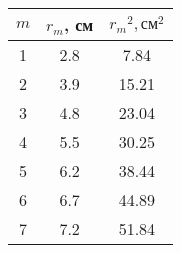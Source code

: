 \begin{tabular}{ccc}
\toprule
$m$ & $r_m$, см & ${r_m}^2, \text{см}^2$ \\
\midrule
1 & 2.8 & 7.84 \\
2 & 3.9 & 15.21 \\
3 & 4.8 & 23.04 \\
4 & 5.5 & 30.25 \\
5 & 6.2 & 38.44 \\
6 & 6.7 & 44.89 \\
7 & 7.2 & 51.84 \\
\bottomrule
\end{tabular}
